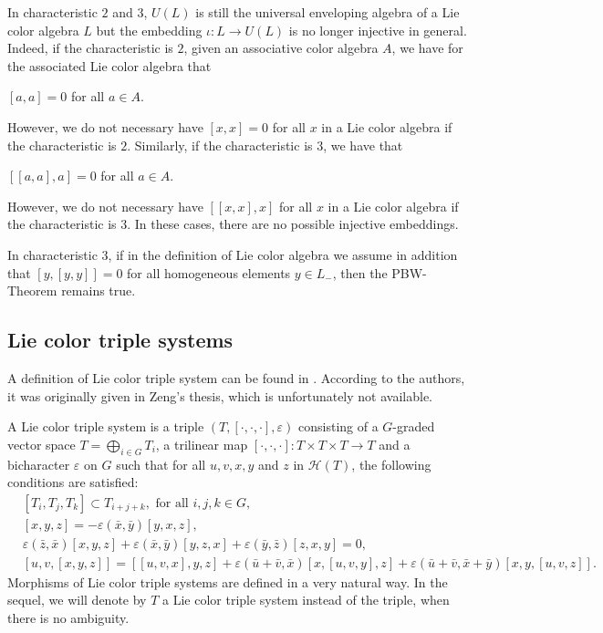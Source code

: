 \documentclass[11pt, twoside]{article}
\begin{document}
\begin{rmq}[\cite{F01}]\label{rmq}
In characteristic $2$ and $3$, $U(L)$ is still the universal enveloping algebra of a Lie color algebra $L$ but the embedding $\iota:L\to U(L) $ is no longer injective in general. Indeed, if the characteristic is $2$, given an associative color algebra $A$, we have for the associated Lie color algebra that \begin{center}
    $[a,a]=0 $ for all $a\in A$.
\end{center} However, we do not necessary have $[x,x]=0$ for all $x$ in a Lie color algebra if the characteristic is $2$. Similarly, if the characteristic is $3$, we have that \begin{center}
    $[[a,a],a]=0 $ for all $a\in A$.
\end{center} However, we do not necessary have $[[x,x],x] $ for all $x$ in a Lie color algebra if the characteristic is $3$. In these cases, there are no possible injective embeddings.
\end{rmq}

\begin{rmq}
    In characteristic 3, if in the definition of Lie color algebra we assume in addition that $[y,[y,y]]=0 $ for all homogeneous elements $y\in L_-$, then the PBW-Theorem remains true.
\end{rmq}

\subsection{Lie color triple systems}

A definition of Lie color triple system can be found in \cite{CZC19}. According to the authors, it was originally given in  Zeng's thesis, which is  unfortunately not available.

\begin{defi}\label{d2.8}
    A Lie color triple system is a triple $(T,[\cdot,\cdot,\cdot],\varepsilon) $ consisting of a $G$-graded vector space $T=\bigoplus\limits_{i\in G}T_i$, a trilinear map $[\cdot,\cdot,\cdot]:T\times T\times T\to T $ and a bicharacter $\varepsilon $ on $G$ such that for all $u,v,x,y$ and $z$ in $\mathcal{H}(T)$, the following conditions are satisfied: \begin{align}
       & [T_i,T_j,T_k]\subset T_{i+j+k} , \text{ for all } i,j,k \in G,\label{lts1}\\
        & [x,y,z]= -\varepsilon(\bar{x},\bar{y})[y,x,z] ,\label{lts2}\\
       & \varepsilon(\bar{z},\bar{x})[x,y,z]+ \varepsilon(\bar{x},\bar{y})[y,z,x]+ \varepsilon(\bar{y},\bar{z})[z,x,y]=0 ,\label{lts3}\\
       & [u,v,[x,y,z]]=[[u,v,x],y,z]+ \varepsilon(\bar{u}+\bar{v},\bar{x})[x,[u,v,y],z] + \varepsilon(\bar{u}+\bar{v},\bar{x}+\bar{y})[x,y,[u,v,z]] \label{lts4}. 
    \end{align} 
    Morphisms of Lie color triple systems are defined in a very natural way.  In the sequel, we will denote by $T $  a Lie color triple system instead of the triple, when there is no ambiguity.
\end{defi}
\end{document}

